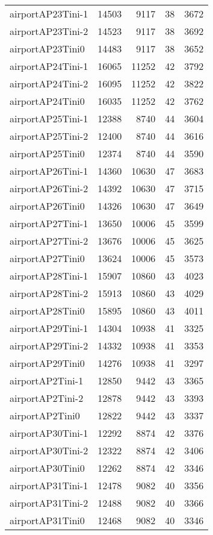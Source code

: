 \begin{longtable}{lrrrr}
airportAP23Tini-1 & 14503 & 9117 & 38 & 3672 \\
airportAP23Tini-2 & 14523 & 9117 & 38 & 3692 \\
airportAP23Tini0 & 14483 & 9117 & 38 & 3652 \\
airportAP24Tini-1 & 16065 & 11252 & 42 & 3792 \\
airportAP24Tini-2 & 16095 & 11252 & 42 & 3822 \\
airportAP24Tini0 & 16035 & 11252 & 42 & 3762 \\
airportAP25Tini-1 & 12388 & 8740 & 44 & 3604 \\
airportAP25Tini-2 & 12400 & 8740 & 44 & 3616 \\
airportAP25Tini0 & 12374 & 8740 & 44 & 3590 \\
airportAP26Tini-1 & 14360 & 10630 & 47 & 3683 \\
airportAP26Tini-2 & 14392 & 10630 & 47 & 3715 \\
airportAP26Tini0 & 14326 & 10630 & 47 & 3649 \\
airportAP27Tini-1 & 13650 & 10006 & 45 & 3599 \\
airportAP27Tini-2 & 13676 & 10006 & 45 & 3625 \\
airportAP27Tini0 & 13624 & 10006 & 45 & 3573 \\
airportAP28Tini-1 & 15907 & 10860 & 43 & 4023 \\
airportAP28Tini-2 & 15913 & 10860 & 43 & 4029 \\
airportAP28Tini0 & 15895 & 10860 & 43 & 4011 \\
airportAP29Tini-1 & 14304 & 10938 & 41 & 3325 \\
airportAP29Tini-2 & 14332 & 10938 & 41 & 3353 \\
airportAP29Tini0 & 14276 & 10938 & 41 & 3297 \\
airportAP2Tini-1 & 12850 & 9442 & 43 & 3365 \\
airportAP2Tini-2 & 12878 & 9442 & 43 & 3393 \\
airportAP2Tini0 & 12822 & 9442 & 43 & 3337 \\
airportAP30Tini-1 & 12292 & 8874 & 42 & 3376 \\
airportAP30Tini-2 & 12322 & 8874 & 42 & 3406 \\
airportAP30Tini0 & 12262 & 8874 & 42 & 3346 \\
airportAP31Tini-1 & 12478 & 9082 & 40 & 3356 \\
airportAP31Tini-2 & 12488 & 9082 & 40 & 3366 \\
airportAP31Tini0 & 12468 & 9082 & 40 & 3346 \\

\end{longtable}

